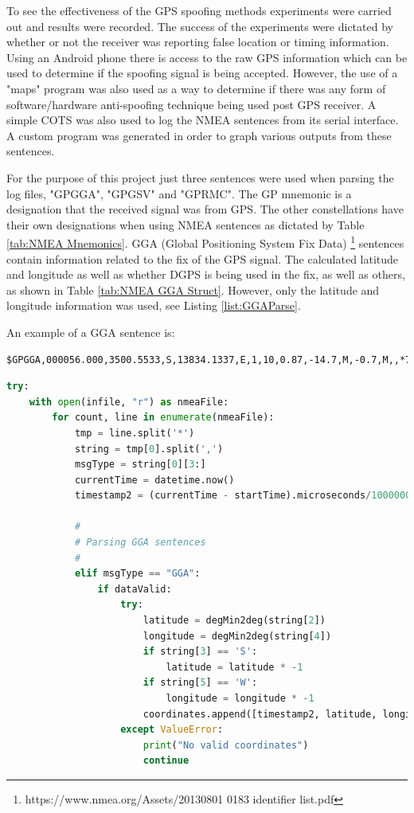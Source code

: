 To see the effectiveness of the GPS spoofing methods experiments were carried out and results were recorded. The success of the experiments were dictated by whether or
not the receiver was reporting false location or timing information. Using an Android phone there is access to the raw GPS information which can be used to determine if
the spoofing signal is being accepted. However, the use of a "maps" program was also used as a way to determine if there was any form of software/hardware anti-spoofing
technique being used post GPS receiver. A simple COTS was also used to log the NMEA sentences from its serial interface. A custom program was generated in order to graph
various outputs from these sentences.

For the purpose of this project just three sentences were used when parsing the log files, "GPGGA", "GPGSV" and "GPRMC". The GP mnemonic is a designation that the
received signal was from GPS. The other constellations have their own designations when using NMEA sentences as dictated by Table \ref{tab:NMEA Mnemonics}. 
GGA (Global Positioning System Fix Data) \footnote{https://www.nmea.org/Assets/20130801 0183 identifier list.pdf} sentences contain information related to the fix of the
GPS signal. The calculated latitude and longitude as well as whether DGPS is being used in the fix, as well as others, as shown in Table \ref{tab:NMEA GGA Struct}.
However, only the latitude and longitude information was used, see Listing \ref{list:GGAParse}.

An example of a GGA sentence is:
\begin{verbatim}
$GPGGA,000056.000,3500.5533,S,13834.1337,E,1,10,0.87,-14.7,M,-0.7,M,,*74
\end{verbatim}

\begin{lstlisting}[language=Python, label=list:GGAParse, caption=Parsing GGA sentences for lattitue and longitude information]
try:
    with open(infile, "r") as nmeaFile:
        for count, line in enumerate(nmeaFile):
            tmp = line.split('*')
            string = tmp[0].split(',')
            msgType = string[0][3:]
            currentTime = datetime.now()
            timestamp2 = (currentTime - startTime).microseconds/1000000

            #
            # Parsing GGA sentences
            #
            elif msgType == "GGA":
                if dataValid:
                    try:
                        latitude = degMin2deg(string[2])
                        longitude = degMin2deg(string[4])
                        if string[3] == 'S':
                            latitude = latitude * -1
                        if string[5] == 'W':
                            longitude = longitude * -1
                        coordinates.append([timestamp2, latitude, longitude])
                    except ValueError:
                        print("No valid coordinates")
                        continue
\end{lstlisting}

